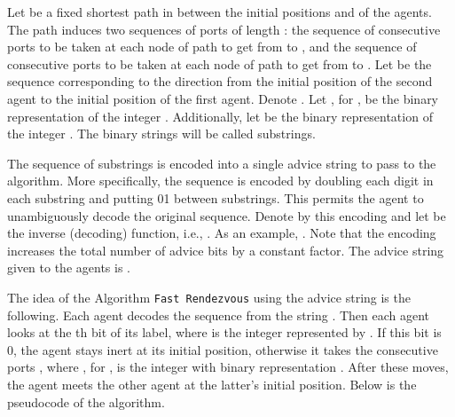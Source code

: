\documentclass{llncs}
\begin{document}
Let  be a fixed shortest path in  between the initial positions  and  of the agents.
The path  induces two sequences of ports of length : the sequence  of consecutive ports to
be taken at each node of path  to get from  to , and the sequence  of consecutive ports to
be taken at each node of path  to get from  to . Let  be the sequence 
corresponding to the direction from the initial position of the second agent to the initial position of the first agent.
Denote . Let , for , be the binary representation of the integer . Additionally,
let  be the binary representation of the integer . The binary strings   will be called substrings.
 
The sequence of substrings  is encoded into a single advice string to pass to the algorithm. More specifically, the sequence is encoded by doubling each digit in each substring and putting 01 between substrings. This permits the agent to unambiguously decode the original sequence. Denote by  this encoding and let  be the inverse (decoding) function, i.e., .
As an example, . Note that the encoding increases the total number of advice bits by a constant factor. The advice string 
given to the agents is .



The idea of the Algorithm {\tt Fast Rendezvous} using the advice string   is the following. Each agent decodes the sequence  from the string
. Then each agent looks at the th bit of its label, where  is the integer represented by . If this bit is 0, the agent stays inert at its initial position, otherwise it takes the 
consecutive ports , where , for , is the integer with binary representation . After these  moves, the agent meets the other agent
at the latter's initial position. Below is the pseudocode of the algorithm.

\begin{center}
\end{center}
\end{document}

